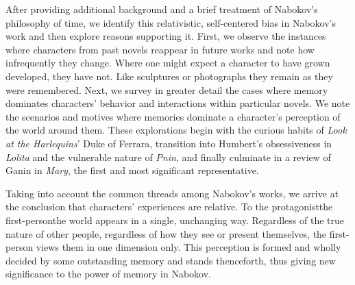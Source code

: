After providing additional background and a brief treatment of Nabokov's philosophy of time, we identify this relativistic, self-centered bias in Nabokov's work and then explore reasons supporting it.
First, we observe the instances where characters from past novels reappear in future works and note how infrequently they change.
Where one might expect a character to have grown developed, they have not.
Like sculptures or photographs they remain as they were remembered.
Next, we survey in greater detail the cases where memory dominates characters' behavior and interactions within particular novels.
We note the scenarios and motives where memories dominate a character's perception of the world around them.
These explorations begin with the curious habits of \emph{Look at the Harlequins}' Duke of Ferrara, transition into Humbert's obsessiveness in \emph{Lolita} and the vulnerable nature of \emph{Pnin}, and finally culminate in a review of Ganin in \emph{Mary}, the first and most significant representative.

Taking into account the common threads among Nabokov's works, we arrive at the conclusion that characters' experiences are relative.
To the protagonist\textemdash the first-person\textemdash the world appears in a single, unchanging way. 
Regardless of the true nature of other people, regardless of how they see or present themselves, the first-person views them in one dimension only.
This perception is formed and wholly decided by some outstanding memory and stands thenceforth, thus giving new significance to the power of memory in Nabokov.



